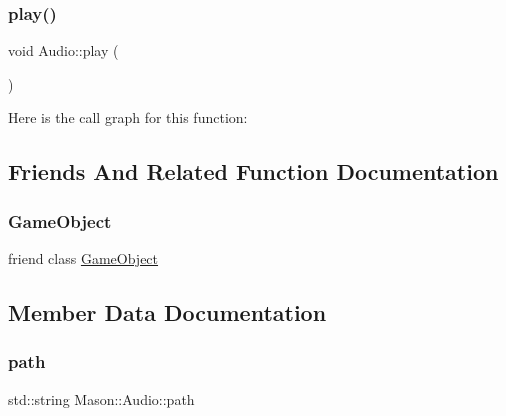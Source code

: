 \hypertarget{class_mason_1_1_audio_a2916f9015031bee9abb98adf0d83e7ee}{}\label{class_mason_1_1_audio_a2916f9015031bee9abb98adf0d83e7ee} 
\subsubsection{\texorpdfstring{play()}{play()}}
{\footnotesize\ttfamily void Audio\+::play (\begin{DoxyParamCaption}{ }\end{DoxyParamCaption})}

Here is the call graph for this function\+:


\subsection{Friends And Related Function Documentation}
\hypertarget{class_mason_1_1_audio_a00df87c957d8f7ee0fc51f07a0542f4a}{}\label{class_mason_1_1_audio_a00df87c957d8f7ee0fc51f07a0542f4a} 
\subsubsection{\texorpdfstring{Game\+Object}{GameObject}}
{\footnotesize\ttfamily friend class \hyperlink{class_mason_1_1_game_object}{Game\+Object}\hspace{0.3cm}{\ttfamily [friend]}}



\subsection{Member Data Documentation}
\hypertarget{class_mason_1_1_audio_a762cc6174ce20a011fe1e3a36e649204}{}\label{class_mason_1_1_audio_a762cc6174ce20a011fe1e3a36e649204} 
\subsubsection{\texorpdfstring{path}{path}}
{\footnotesize\ttfamily std\+::string Mason\+::\+Audio\+::path}

\hypertarget{class_mason_1_1_audio_a100d9da58685f865bf03dcf44a55fb63}{}\label{class_mason_1_1_audio_a100d9da58685f865bf03dcf44a55fb63} 
